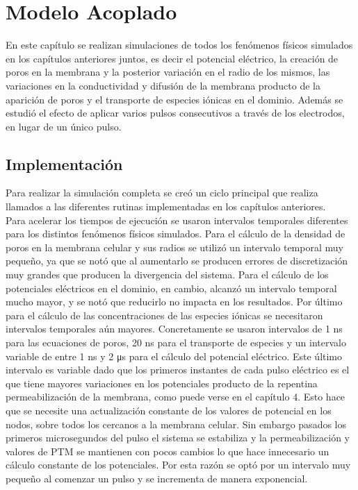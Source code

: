 \chapter{Modelo Acoplado}

En este capítulo se realizan simulaciones de todos los fenómenos físicos simulados en los capítulos anteriores juntos, es decir el potencial eléctrico, la creación de poros en la membrana y la posterior variación en el radio de los mismos, las variaciones en la conductividad y difusión de la membrana producto de la aparición de poros y el transporte de especies iónicas en el dominio. Además se estudió el efecto de aplicar varios pulsos consecutivos a través de los electrodos, en lugar de un único pulso.

\section{Implementación}
Para realizar la simulación completa se creó un ciclo principal que realiza llamados a las diferentes rutinas implementadas en los capítulos anteriores.\\

Para acelerar los tiempos de ejecución se usaron intervalos temporales diferentes para los distintos fenómenos físicos simulados. Para el cálculo de la densidad de poros en la membrana celular y sus radios se utilizó un intervalo temporal muy pequeño, ya que se notó que al aumentarlo se producen errores de discretización muy grandes que producen la divergencia del sistema. Para el cálculo de los potenciales eléctricos en el dominio, en cambio, alcanzó un intervalo temporal mucho mayor, y se notó que reducirlo no impacta en los resultados. Por último para el cálculo de las concentraciones de las especies iónicas se necesitaron intervalos temporales aún mayores. Concretamente se usaron intervalos de 1 \si{\nano\second} para las ecuaciones de poros, 20 \si{\nano\second} para el transporte de especies y un intervalo variable de entre 1 \si{\nano\second} y 2 \si{\micro\second} para el cálculo del potencial eléctrico. Este último intervalo es variable dado que los primeros instantes de cada pulso eléctrico es el que tiene mayores variaciones en los potenciales producto de la repentina permeabilización de la membrana, como puede verse en el capítulo 4. Esto hace que se necesite una actualización constante de los valores de potencial en los nodos, sobre todos los cercanos a la membrana celular. Sin embargo pasados los primeros microsegundos del pulso el sistema se estabiliza y la permeabilización y valores de PTM se mantienen con pocos cambios lo que hace innecesario un cálculo constante de los potenciales. Por esta razón se optó por un intervalo muy pequeño al comenzar un pulso y se incrementa de manera exponencial.\\

